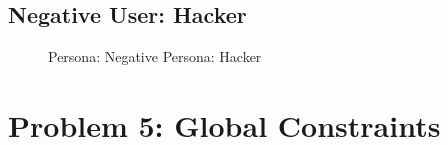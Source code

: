 \documentclass[a4paper,12pt]{report}
\begin{document}
\subsection{Negative User: Hacker}
\begin{figure}[!htb]
	\caption{\label{fig:negative_persona_hacker}Persona: Negative Persona: Hacker}	
\end{figure}




\section{Problem 5: Global Constraints}
\end{document}
